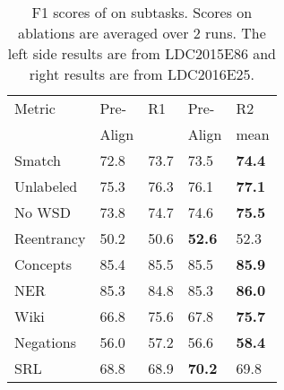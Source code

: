 \documentclass[11pt,a4paper]{article}
\begin{document}
\begin{table}[t] 
    \begin{center} 
        \begin{tabular}{lll|ll} 
            \hline  Metric  &  Pre- &  R1 &  Pre-   & R2 \\  
                           &Align    &       &  Align   &mean \\ \hline
            Smatch &           72.8 & 73.7    & 73.5    & {\bf74.4}\\ \hline
            Unlabeled&          75.3 & 76.3   &76.1    &  {\bf77.1}\\
            No WSD &            73.8 & 74.7     & 74.6     &  {\bf75.5}\\
            Reentrancy &         50.2&50.6    &{\bf52.6 }   & 52.3\\
            Concepts &          85.4& 85.5  &85.5      & {\bf 85.9}\\
            NER &           85.3   &84.8  & 85.3      & {\bf86.0}\\
            Wiki &             66.8  & 75.6  &67.8      &   {\bf75.7}\\
            Negations&         56.0 & 57.2    &56.6     & {\bf58.4}\\
            SRL&             68.8 &68.9     &{\bf  70.2  }    & 69.8\\
            \hline
        \end{tabular}
    \end{center}
    \vspace{-2ex}
	\caption{\label{table:ablation} F1 scores of on subtasks. Scores on ablations are averaged over 2 runs.
     The left side results are from LDC2015E86 and right results are from LDC2016E25.}
     \vspace{-1ex}
\end{table}
\end{document}

